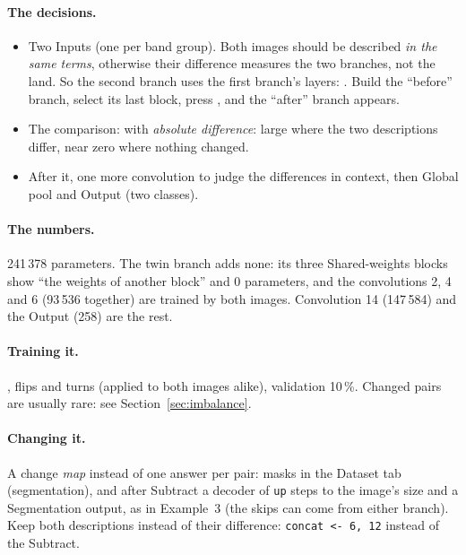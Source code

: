 \paragraph{The decisions.}
\begin{itemize}[nosep]
  \item Two Inputs (one per band group). Both images should be described \emph{in the same terms}, otherwise their difference measures
        the two branches, not the land. So the second branch uses the first branch's layers: . Build the ``before''
        branch, select its last block, press , and the ``after'' branch appears.
  \item The comparison:  with \emph{absolute difference}: large where the two descriptions differ, near zero where nothing
        changed.
  \item After it, one more convolution to judge the differences in context, then Global pool and Output (two classes).
\end{itemize}



\paragraph{The numbers.} 241\,378 parameters. The twin branch adds none: its three Shared-weights blocks show ``the weights of another
block'' and 0 parameters, and the convolutions 2, 4 and 6 (93\,536 together) are trained by both images. Convolution 14 (147\,584) and the
Output (258) are the rest.

\paragraph{Training it.} , flips and turns (applied to both images alike), validation 10\,\%. Changed pairs are usually
rare: see Section~\ref{sec:imbalance}.

\paragraph{Changing it.} A change \emph{map} instead of one answer per pair: masks in the Dataset tab (segmentation), and after
Subtract a decoder of \texttt{up} steps to the image's size and a Segmentation output, as in Example~3 (the skips can come from either
branch). Keep both descriptions instead of their difference: \texttt{concat <- 6, 12} instead of the Subtract.

